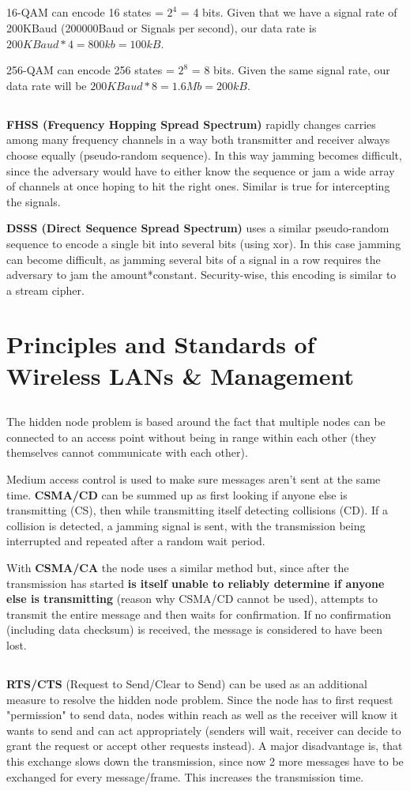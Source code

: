\documentclass[12pt]{article}
\newcommand{\exercise}{\subsection{}\setcounter{subsubsection}{0}}
\begin{document}
\exercise
16-QAM can encode 16 states = $2^4$ = 4 bits. Given that we have a signal rate of 200KBaud (200000Baud or Signals per second), our data rate is $200KBaud*4=800kb=100kB$.

256-QAM can encode 256 states = $2^8$ = 8 bits. Given the same signal rate, our data rate will be $200KBaud*8=1.6Mb=200kB$.

\exercise
\textbf{FHSS (Frequency Hopping Spread Spectrum)} rapidly changes carries among many frequency channels in a way both transmitter and receiver always choose equally (pseudo-random sequence). In this way jamming becomes difficult, since the adversary would have to either know the sequence or jam a wide array of channels at once hoping to hit the right ones. Similar is true for intercepting the signals.

\textbf{DSSS (Direct Sequence Spread Spectrum)} uses a similar pseudo-random sequence to encode a single bit into several bits (using xor). In this case jamming can become difficult, as jamming several bits of a signal in a row requires the adversary to jam the amount*constant. Security-wise, this encoding is similar to a stream cipher.

\section*{Principles and Standards of Wireless LANs \& Management}
\exercise
The hidden node problem is based around the fact that multiple nodes can be connected to an access point without being in range within each other (they themselves cannot communicate with each other).

Medium access control is used to make sure messages aren't sent at the same time. \textbf{CSMA/CD} can be summed up as first looking if anyone else is transmitting (CS), then while transmitting itself detecting collisions (CD). If a collision is detected, a jamming signal is sent, with the transmission being interrupted and repeated after a random wait period.

With \textbf{CSMA/CA} the node uses a similar method but, since after the transmission has started \textbf{is itself unable to reliably determine if anyone else is transmitting} (reason why CSMA/CD cannot be used), attempts to transmit the entire message and then waits for confirmation. If no confirmation (including data checksum) is received, the message is considered to have been lost.

\exercise
\textbf{RTS/CTS} (Request to Send/Clear to Send) can be used as an additional measure to resolve the hidden node problem. Since the node has to first request "permission" to send data, nodes within reach as well as the receiver will know it wants to send and can act appropriately (senders will wait, receiver can decide to grant the request or accept other requests instead). A major disadvantage is, that this exchange slows down the transmission, since now 2 more messages have to be exchanged for every message/frame. This increases the transmission time.
\end{document}
